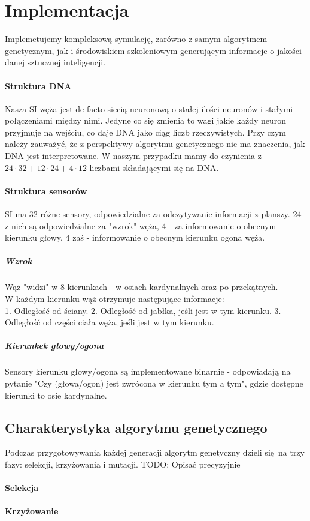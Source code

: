 \documentclass{article}
\begin{document}
\section{Implementacja}
Implemetujemy kompleksową symulację, zarówno z samym algorytmem genetycznym, jak i środowiskiem szkoleniowym generującym informacje o jakości danej sztucznej inteligencji.
\paragraph{Struktura DNA}
Nasza SI węża jest de facto siecią neuronową o stałej ilości neuronów i stałymi połączeniami między nimi. 
Jedyne co się zmienia to wagi jakie każdy neuron przyjmuje na wejściu, co daje DNA jako ciąg liczb rzeczywistych.
Przy czym należy zauważyć, że z perspektywy algorytmu genetycznego nie ma znaczenia, jak DNA jest interpretowane.
W naszym przypadku mamy do czynienia z $24\cdot32+12\cdot24+4\cdot12$ liczbami składającymi się na DNA.
\paragraph{Struktura sensorów}
SI ma 32 różne sensory, odpowiedzialne za odczytywanie informacji z planszy.
24 z nich są odpowiedzialne za "wzrok" węża, 4 - za informowanie o obecnym kierunku głowy, 4 zaś - informowanie o obecnym kierunku ogona węża.
\subparagraph{Wzrok}
Wąż "widzi" w 8 kierunkach - w osiach kardynalnych oraz po przekątnych. \\
W każdym kierunku wąż otrzymuje następujące informacje: \\
1. Odległość od ściany.
2. Odległość od jabłka, jeśli jest w tym kierunku. 
3. Odległość od części ciała węża, jeśli jest w tym kierunku.
\subparagraph{Kierunkek głowy/ogona}
Sensory kierunku głowy/ogona są implementowane binarnie - odpowiadają na pytanie "Czy (głowa/ogon) jest zwrócona w kierunku tym a tym", gdzie dostępne kierunki to osie kardynalne.
\subsection{Charakterystyka algorytmu genetycznego}
Podczas przygotowywania każdej generacji algorytm genetyczny dzieli się na trzy fazy: selekcji, krzyżowania i mutacji.
TODO: Opisać precyzyjnie
\paragraph{Selekcja}
\paragraph{Krzyżowanie}
\end{document}
